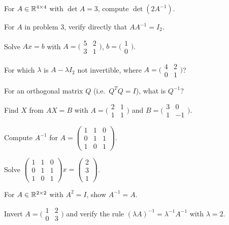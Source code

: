\begin{problems}
    \item For $A \in \mathbb{R}^{4 \times 4}$ with $\det A = 3$, compute $\det(2 A^{-1})$.
    \item For $A$ in problem 3, verify directly that $A A^{-1} = I_{2}$.
    \item Solve $A x = b$ with $A = \bigl(\begin{smallmatrix} 5 & 2 \\ 3 & 1 \end{smallmatrix}\bigr)$, $b = \bigl(\begin{smallmatrix} 1 \\ 0 \end{smallmatrix}\bigr)$.
    \item For which $\lambda$ is $A - \lambda I_{2}$ not invertible, where $A = \bigl(\begin{smallmatrix} 4 & 2 \\ 0 & 1 \end{smallmatrix}\bigr)$?
    \item For an orthogonal matrix $Q$ (i.e.\ $Q^{T} Q = I$), what is $Q^{-1}$?
    \item Find $X$ from $A X = B$ with $A = \bigl(\begin{smallmatrix} 2 & 1 \\ 1 & 1 \end{smallmatrix}\bigr)$ and $B = \bigl(\begin{smallmatrix} 3 & 0 \\ 1 & -1 \end{smallmatrix}\bigr)$.
    \item Compute $A^{-1}$ for $A = \begin{pmatrix} 1 & 1 & 0 \\ 0 & 1 & 1 \\ 1 & 0 & 1 \end{pmatrix}$.
    \item Solve $\begin{pmatrix} 1 & 1 & 0 \\ 0 & 1 & 1 \\ 1 & 0 & 1 \end{pmatrix} x = \begin{pmatrix} 2 \\ 3 \\ 1 \end{pmatrix}$.
    \item For $A \in \mathbb{R}^{2 \times 2}$ with $A^{2} = I$, show $A^{-1} = A$.
    \item Invert $A = \bigl(\begin{smallmatrix} 1 & 2 \\ 0 & 3 \end{smallmatrix}\bigr)$ and verify the rule $(\lambda A)^{-1} = \lambda^{-1} A^{-1}$ with $\lambda = 2$.
\end{problems}

